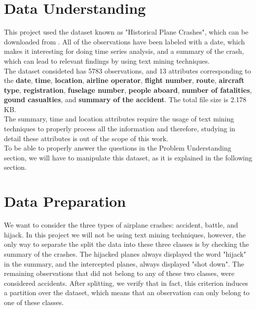 \documentclass[12pt]{article}
\begin{document}
\section{Data Understanding}
This project used the dataset known as "Historical Plane Crashes", which can be downloaded from \cite{bib:dataset}. All of the observations have been labeled with a date, which makes it interesting for doing time series analysis, and a summary of the crash, which can lead to relevant findings by using text mining techniques.\\

The dataset consideted has 5783 observations, and 13 attributes corresponding to the \textbf{date}, \textbf{time}, \textbf{location}, \textbf{airline operator}, \textbf{flight number}, \textbf{route}, \textbf{aircraft type}, \textbf{registration}, \textbf{fuselage number}, \textbf{people aboard}, \textbf{number of fatalities}, \textbf{gound casualties}, and \textbf{summary of the accident}. The total file size is 2.178 KB.\\

The summary, time and location attributes require the usage of text mining techniques to properly process all the information and therefore, studying in detail these attributes is out of the scope of this work.\\

To be able to properly answer the questions in the Problem Understanding section, we will have to manipulate this dataset, as it is explained in the following section.\\
	
\section{Data Preparation}

We want to consider the three types of airplane crashes: accident, battle, and hijack. In this project we will not be using text mining techniques, however, the only way to separate the split the data into these three classes is by checking the summary of the crashes. The hijacked planes always displayed the word "hijack" in the summary, and the intercepted planes, always displayed "shot down". The remaining observations that did not belong to any of these two classes, were considered accidents. After splitting, we verify that in fact, this criterion induces a partition over the dataset, which means that an observation can only belong to one of these classes.\\
\end{document}
